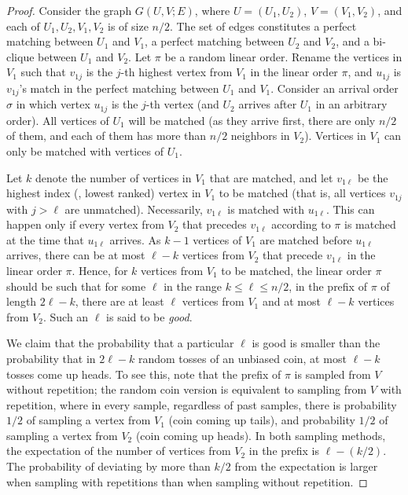 \begin{proof}
	Consider the graph $G(U,V;E)$, where $U=(U_1,U_2)$, $V=(V_1,V_2)$, and each of $U_1,U_2,V_1,V_2$ is of size $n/2$. The set of edges constitutes a perfect matching between $U_1$ and $V_1$, a perfect matching between $U_2$ and $V_2$, and a bi-clique between $U_1$ and $V_2$.
	Let $\pi$ be a random linear order. Rename the vertices in $V_1$ such that $v_{1j}$ is the $j$-th highest vertex from $V_1$ in the linear order $\pi$, and $u_{1j}$ is $v_{1j}$'s match in the perfect matching between $U_1$ and $V_1$.
	Consider an arrival order $\sigma$ in which vertex $u_{1j}$ is the $j$-th vertex (and $U_2$ arrives after $U_1$ in an arbitrary order). All vertices of $U_1$ will be matched (as they arrive first, there are only $n/2$ of them, and each of them has more than $n/2$ neighbors in $V_2$). Vertices in $V_1$ can only be matched with vertices of $U_1$. 
	
	Let $k$ denote the number of vertices in $V_1$ that are matched, and let $v_{1\ell}$ be the highest index (\ie, lowest ranked) vertex in $V_1$ to be matched (that is, all vertices $v_{1j}$ with $j>\ell$ are unmatched). Necessarily, $v_{1\ell}$ is matched with $u_{1\ell}$. This can happen only if every vertex from $V_2$ that precedes $v_{1\ell}$ according to $\pi$ is matched at the time that $u_{1\ell}$ arrives. As $k-1$ vertices of $V_1$ are matched before $u_{1\ell}$ arrives, there can be at most $\ell - k$ vertices from $V_2$ that precede $v_{1\ell}$ in the linear order $\pi$. Hence, for $k$ vertices from $V_1$ to be matched, the linear order $\pi$ should be such that for some $\ell$ in the range $k \le \ell \le n/2$, in the prefix of $\pi$ of length $2\ell-k$, there are at least $\ell$ vertices from $V_1$ and at most $\ell - k$ vertices from $V_2$. Such an $\ell$ is said to be \emph{good}. 
	
	We claim that the probability that a particular $\ell$ is good is smaller than the probability that in $2\ell-k$ random tosses of an unbiased coin, at most $\ell-k$ tosses come up heads. To see this, note that the prefix of $\pi$ is sampled from $V$ without repetition; the random coin version is equivalent to sampling from $V$ with repetition, where in every sample, regardless of past samples, there is probability %
 $1/2$   %
of sampling a vertex from $V_1$ (coin coming up tails), and probability
%
$1/2$   %
of sampling a vertex from $V_2$ (coin coming up heads). In both sampling methods, the expectation of the number of vertices from $V_2$ in the prefix is 
%
$\ell - (k/2)$.   %
 The probability of deviating by more than 
%
$k/2$  %
from the expectation is larger when sampling with repetitions than when sampling without repetition. 
	

\end{proof}
